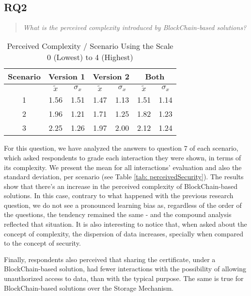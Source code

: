 \subsection{RQ2}

\begin{quote}
\textit{What is the perceived complexity introduced by BlockChain-based solutions?}
\end{quote}

\begin{table}[htb]
    \centering
    \caption{Perceived Complexity / Scenario Using the Scale 0 (Lowest) to 4 (Highest)}
    \label{tab: perceivedComplexity}
    \begin{tabular}{c|cccc|cc}
    \hline 
    Scenario & \multicolumn{2}{c}{\bf Version 1} & \multicolumn{2}{c}{\bf Version 2} \vrule & \multicolumn{2}{c}{\bf Both} \\
    \hline
     & $\tilde{x}$ & $\sigma_{x}$ & $\tilde{x}$ & $\sigma_{x}$ & $\tilde{x}$ & $\sigma_{x}$ \\
    \hline
    1 & 1.56 & 1.51 & 1.47 & 1.13 & 1.51 & 1.14 \\
    2 & 1.96 & 1.21 & 1.71 & 1.25 & 1.82 & 1.23 \\
    3 & 2.25 & 1.26 & 1.97 & 2.00 & 2.12 & 1.24 \\
    \hline
    \end{tabular}
\end{table}

For this question, we have analyzed the answers to question 7 of each scenario, which asked respondents to grade each interaction they were shown, in terms of its complexity. We present the mean for all interactions' evaluation and also the standard deviation, per scenario (see Table \ref{tab: perceivedSecurity}). The results show that there's an increase in the perceived complexity of BlockChain-based solutions. In this case, contrary to what happened with the previous research question, we do not see a pronounced learning bias as, regardless of the order of the questions, the tendency remained the same - and the compound analysis reflected that situation. It is also interesting to notice that, when asked about the concept of complexity, the dispersion of data increases, specially when compared to the concept of security.

Finally, respondents also perceived that sharing the certificate, under a BlockChain-based solution, had fewer interactions with the possibility of allowing unauthorized access to data, than with the typical purpose. The same is true for BlockChain-based solutions over the Storage Mechanism.


